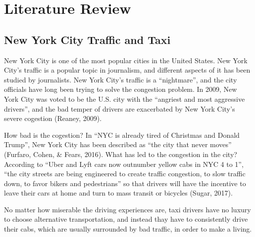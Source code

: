 \documentclass[12pt,twoside]{reedthesis}
\theoremstyle{definition}
\theoremstyle{definition}
\theoremstyle{definition}
\theoremstyle{remark}
\begin{document}
\section{Literature Review}\label{literature-review}

\subsection{New York City Traffic and
Taxi}\label{new-york-city-traffic-and-taxi}

New York City is one of the most popular cities in the United States.
New York City's traffic is a popular topic in journalism, and different
aspects of it has been studied by journalists. New York City's traffic
is a ``nightmare'', and the city officials have long been trying to
solve the congestion problem. In 2009, New York City was voted to be the
U.S. city with the ``angriest and most aggressive drivers'', and the bad
temper of drivers are exacerbated by New York City's severe cogestion
(Reaney, 2009).

How bad is the cogestion? In ``NYC is already tired of Christmas and
Donald Trump'', New York City has been described as ``the city that
never moves'' (Furfaro, Cohen, \& Fears, 2016). What has led to the
congestion in the city? According to ``Uber and Lyft cars now outnumber
yellow cabs in NYC 4 to 1'', ``the city streets are being engineered to
create traffic congestion, to slow traffic down, to favor bikers and
pedestrians'' so that drivers will have the incentive to leave their
cars at home and turn to mass transit or bicycles (Sugar, 2017).

No matter how miserable the driving experiences are, taxi drivers have
no luxury to choose alternative transportation, and instead thay have to
consistently drive their cabs, which are usually surrounded by bad
traffic, in order to make a living.
\end{document}
